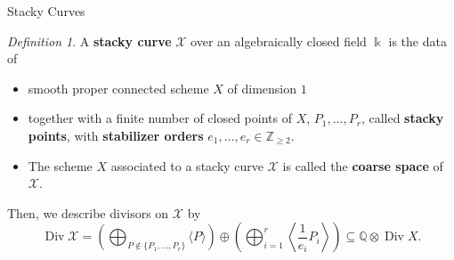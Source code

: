 \documentclass{beamer}
\theoremstyle{remark}
\newtheorem{defn}[thm]{Definition}
\newcommand\BQ{{\mathbb Q}}
\newcommand\BZ{{\mathbb Z}}
\newcommand \sx{{\mathscr X}}
\DeclareMathOperator\di{Div}
\newcommand\Bk{{\Bbbk}}
\begin{document}
\begin{frame}{Stacky Curves}
\begin{defn}
A \textbf{stacky curve} $\sx$ over an algebraically closed field $\Bk$
is the data of
	\begin{itemize}
		\item smooth proper connected scheme $X$ of dimension $1$ \\ 
		\item together with a finite number of closed points of $X$, $P_
			1, \ldots, P_r$, called {\bf stacky points}, with {\bf stabilizer 
			orders} $e_1, \ldots, e_r \in \BZ_{\geq 2}.$ \\ 
		\item The scheme $X$ associated to a stacky curve $\sx$ is 
			called the {\bf coarse space} of $\sx$.
	\end{itemize}
\end{defn}



Then, we describe divisors on $\sx$ by
\[
	\di \sx = \left(\bigoplus_{P\notin \{P_1, \ldots, P_r\}} \langle 
	P \rangle \right) \oplus \left(\bigoplus_{i = 1}^r \left \langle 
	\frac{1}{e_i}P_i \right \rangle \right) \subseteq \BQ \otimes \di X.
\]

\end{frame}

\end{document}

